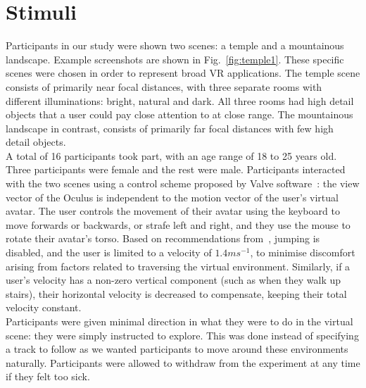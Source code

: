 \section{Stimuli}


Participants in our study were shown two scenes: a temple and a mountainous landscape. Example screenshots are shown in Fig.~\ref{fig:temple1}. These specific scenes were chosen in order to represent broad VR applications. The temple scene consists of primarily near focal distances, with three separate rooms with different illuminations: bright, natural and dark. All three rooms had high detail objects that a user could pay close attention to at close range. The mountainous landscape in contrast, consists of primarily far focal distances with few high detail objects. 
\\

A total of 16 participants took part, with an age range of 18 to 25 years old. Three participants were female and the rest were male. Participants interacted with the two scenes using a control scheme proposed by Valve software~\cite{valveVR}: the view vector of the Oculus is independent to the motion vector of the user's virtual avatar. The user controls the movement of their avatar using the keyboard to move forwards or backwards, or strafe left and right, and they use the mouse to rotate their avatar's torso.  Based on recommendations from~\cite{oculus}, jumping is disabled, and the user is limited to a velocity of $1.4ms^{-1}$, to minimise discomfort arising from factors related to traversing the virtual environment. Similarly, if a user's velocity has a non-zero vertical component (such as when they walk up stairs), their horizontal velocity is decreased to compensate, keeping their total velocity constant.\\

Participants were given minimal direction in what they were to do in the virtual scene: they were simply instructed to explore. This was done instead of specifying a track to follow as we wanted participants to move around these environments naturally. Participants were allowed to withdraw from the experiment at any time if they felt too sick.\\
